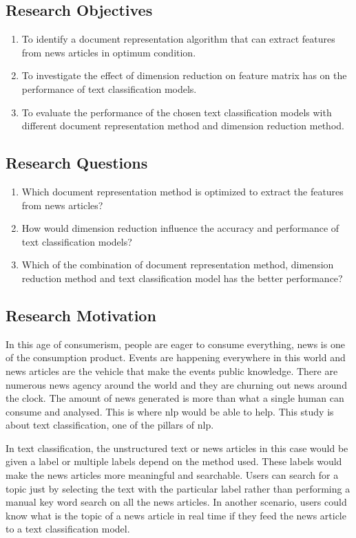 \subsection{Research Objectives}
\begin{enumerate}
	\item To identify a document representation algorithm that can extract features from news articles in optimum condition.
	\item To investigate the effect of dimension reduction on feature matrix has on the performance of text classification models.
	\item To evaluate the performance of the chosen text classification models with different document representation method and dimension reduction method.
\end{enumerate}


\subsection{Research Questions}
\begin{enumerate}
	\item Which document representation method is optimized to extract the features from news articles?
	\item How would dimension reduction influence the accuracy and performance of text classification models?
	\item Which of the combination of document representation method, dimension reduction method and text classification model has the better performance?
\end{enumerate}

\subsection{Research Motivation}
In this age of consumerism, people are eager to consume everything, news is one of the consumption product. Events are happening everywhere in this world and news articles are the vehicle that make the events public knowledge. There are numerous news agency around the world and they are churning out news around the clock. The amount of news generated is more than what a single human can consume and analysed. This is where \ac{nlp} would be able to help. This study is about text classification, one of the pillars of \ac{nlp}.

In text classification, the unstructured text or news articles in this case would be given a label or multiple labels depend on the method used. These labels would make the news articles more meaningful and searchable. Users can search for a topic just by selecting the text with the particular label rather than performing a manual key word search on all the news articles. In another scenario, users could know what is the topic of a news article in real time if they feed the news article to a text classification model.

